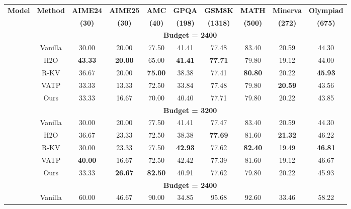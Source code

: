 \begin{table}[t]
\centering
\small
\renewcommand{\arraystretch}{1.2} %
\setlength{\tabcolsep}{6pt} %
\begin{tabular}{l|ccccccccc}
\toprule
\multirow{2}{*}{\parbox{1.8cm}{\centering\textbf{Model}}} & \multirow{2}{*}{\textbf{Method}} & \textbf{AIME24} & \textbf{AIME25} & \textbf{AMC} & \textbf{GPQA} & \textbf{GSM8K} & \textbf{MATH} & \textbf{Minerva} & \textbf{Olympiad}  \\
& & \textbf{(30)} & \textbf{(30)} & \textbf{(40)} & \textbf{(198)} & \textbf{(1318)} & \textbf{(500)} & \textbf{(272)} & \textbf{(675)} \\
\hline
\multirow{13}{*}{\parbox{1.8cm}{\centering\textbf{}}}
 & \multicolumn{9}{c}{\cellcolor{cyan!5}\textbf{Budget = 2400}} \\
& Vanilla & 30.00 & 20.00 & 77.50 & 41.41 & 77.48 & 83.40 & 20.59 & 44.30 \\
& H2O & \textbf{43.33} & \textbf{20.00} & 65.00 & \textbf{41.41} & \textbf{77.71} & 79.80 & 19.12 & 44.00 \\
& R-KV & 36.67 & 20.00 & \textbf{75.00} & 38.38 & 77.41 & \textbf{80.80} & 20.22 & \textbf{45.93} \\
& VATP & 33.33 & 13.33 & 72.50 & 33.84 & 77.48 & 79.80 & \textbf{20.59} & 43.56 \\
& Ours & 33.33 & 16.67 & 70.00 & 40.40 & 77.71 & 79.80 & 20.22 & 43.85 \\
 & \multicolumn{9}{c}{\cellcolor{cyan!5}\textbf{Budget = 3200}} \\
& Vanilla & 30.00 & 20.00 & 77.50 & 41.41 & 77.47 & 83.40 & 20.59 & 44.30 \\
& H2O & 36.67 & 23.33 & 72.50 & 38.38 & \textbf{77.69} & 81.60 & \textbf{21.32} & 46.22  \\
& R-KV & 30.00 & 23.33 & 77.50 & \textbf{42.93} & 77.62 & \textbf{82.40} & 19.49 & \textbf{46.81}  \\
& VATP & \textbf{40.00} & 16.67 & 72.50 & 42.42 & 77.39 & 81.60 & 19.12 & 46.67  \\
& Ours & 33.33 & \textbf{26.67} & \textbf{82.50} & 40.91 & 77.62 & 79.80 & 20.22 & 45.93 \\
\hline
\multirow{13}{*}{\parbox{1.8cm}{\centering\textbf{Qwen3-8B}}}
 & \multicolumn{9}{c}{\cellcolor{cyan!5}\textbf{Budget = 2400}} \\
& Vanilla & 60.00 & 46.67 & 90.00 & 34.85 & 95.68 & 92.60 & 33.46 & 58.22 \\

\end{tabular}
\end{table}

